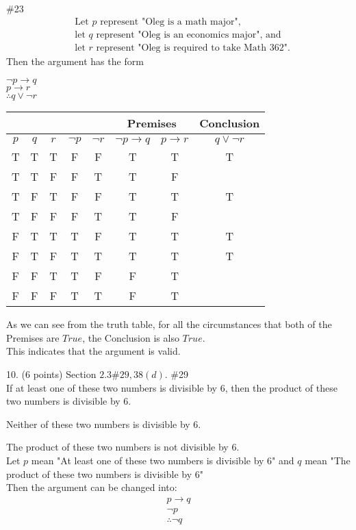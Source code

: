 \documentclass{article}
\begin{document}
\#23\\
\begin{align*}
     &\text{Let } p \text{ represent "Oleg is a math major",} \\
    &\text{let } q \text{ represent "Oleg is an economics major", and} \\
    &\text{let } r \text{ represent "Oleg is required to take Math 362".}
\end{align*}
Then the argument has the form\\
\begin{center}
$\neg p \rightarrow q$\\
$p \rightarrow r$\\
$\therefore q \vee \neg r$

    \begin{tabular}{|c|c|c|c|c|c|c|c|}
    \hline
    \multicolumn{5}{|c|}{} & \multicolumn{2}{|c|}{Premises} & \multicolumn{1}{|c|}{Conclusion}\\
    \hline
        $p$ & $q$ & $r$ & $\neg p$ & $\neg r$ & $\neg p \rightarrow q$ & $p 
        \rightarrow r$& $ q \vee \neg r $ \\
    \hline
        T & T & T & F & F & T & T & T \\
        T & T & F & F & T & T & F &   \\
        T & F & T & F & F & T & T & T \\
        T & F & F & F & T & T & F &   \\
        F & T & T & T & F & T & T & T \\
        F & T & F & T & T & T & T & T \\
        F & F & T & T & F & F & T &   \\
        F & F & F & T & T & F & T &   \\ 
    \hline
    \end{tabular}
\end{center}
As we can see from the truth table, for all the circumstances that both of the Premises are $True$, the Conclusion is also $True$.\\
This indicates that the argument is valid.



10. (6 points) Section $2.3 \# 29,38(d)$.
\#29\\
If at least one of these two numbers is divisible by 6, then the product of these two numbers is divisible by 6.

Neither of these two numbers is divisible by 6.
 
The product of these two numbers is not divisible by 6.\\
Let $p$ mean "At least one of these two numbers is divisible by 6"
and $q$ mean "The product of these two numbers is divisible by 6"\\
Then the argument can be changed into:\\
\begin{align*}
    p \rightarrow q \\
    \neg p\\
    \therefore \neg q \tag{Invalid: inverse error}
\end{align*}
\end{document}
